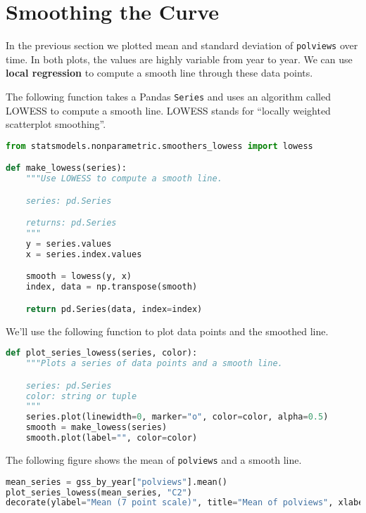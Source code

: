 \section{Smoothing the Curve}\label{smoothing-the-curve}

In the previous section we plotted mean and standard deviation of
\passthrough{\lstinline!polviews!} over time. In both plots, the values
are highly variable from year to year. We can use \textbf{local
regression} to compute a smooth line through these data points.

The following function takes a Pandas \passthrough{\lstinline!Series!}
and uses an algorithm called LOWESS to compute a smooth line. LOWESS
stands for ``locally weighted scatterplot smoothing''.

\begin{lstlisting}[language=Python,style=source]
from statsmodels.nonparametric.smoothers_lowess import lowess

def make_lowess(series):
    """Use LOWESS to compute a smooth line.

    series: pd.Series

    returns: pd.Series
    """
    y = series.values
    x = series.index.values

    smooth = lowess(y, x)
    index, data = np.transpose(smooth)

    return pd.Series(data, index=index)
\end{lstlisting}

We'll use the following function to plot data points and the smoothed
line.

\begin{lstlisting}[language=Python,style=source]
def plot_series_lowess(series, color):
    """Plots a series of data points and a smooth line.

    series: pd.Series
    color: string or tuple
    """
    series.plot(linewidth=0, marker="o", color=color, alpha=0.5)
    smooth = make_lowess(series)
    smooth.plot(label="", color=color)
\end{lstlisting}

The following figure shows the mean of
\passthrough{\lstinline!polviews!} and a smooth line.

\begin{lstlisting}[language=Python,style=source]
mean_series = gss_by_year["polviews"].mean()
plot_series_lowess(mean_series, "C2")
decorate(ylabel="Mean (7 point scale)", title="Mean of polviews", xlabel="Year")
\end{lstlisting}

